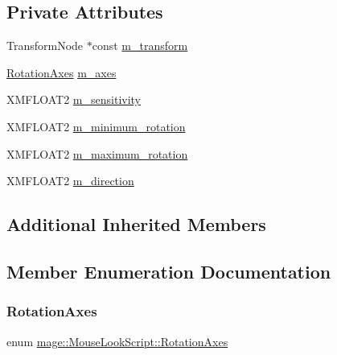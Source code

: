 \subsection*{Private Attributes}
\begin{DoxyCompactItemize}
\item 
Transform\+Node $\ast$const \hyperlink{classmage_1_1_mouse_look_script_a419b30350dc3eed30ae2f983812391f5}{m\+\_\+transform}
\item 
\hyperlink{classmage_1_1_mouse_look_script_af63fd955f796c11e0378813e5d1ab5f8}{Rotation\+Axes} \hyperlink{classmage_1_1_mouse_look_script_ab5df1b96d5860a9b8f30256e7c89b26b}{m\+\_\+axes}
\item 
X\+M\+F\+L\+O\+A\+T2 \hyperlink{classmage_1_1_mouse_look_script_a4f38b9bd8e7271503a70753ce6a923c7}{m\+\_\+sensitivity}
\item 
X\+M\+F\+L\+O\+A\+T2 \hyperlink{classmage_1_1_mouse_look_script_ad09bda241666f60dfc408500cafd073d}{m\+\_\+minimum\+\_\+rotation}
\item 
X\+M\+F\+L\+O\+A\+T2 \hyperlink{classmage_1_1_mouse_look_script_a0d5f2933555b76efd7cf83c7672574dd}{m\+\_\+maximum\+\_\+rotation}
\item 
X\+M\+F\+L\+O\+A\+T2 \hyperlink{classmage_1_1_mouse_look_script_a07c9a61869dab687a0426fa0c4b41fa7}{m\+\_\+direction}
\end{DoxyCompactItemize}
\subsection*{Additional Inherited Members}


\subsection{Member Enumeration Documentation}
\hypertarget{classmage_1_1_mouse_look_script_af63fd955f796c11e0378813e5d1ab5f8}{}\label{classmage_1_1_mouse_look_script_af63fd955f796c11e0378813e5d1ab5f8} 
\subsubsection{\texorpdfstring{Rotation\+Axes}{RotationAxes}}
{\footnotesize\ttfamily enum \hyperlink{classmage_1_1_mouse_look_script_af63fd955f796c11e0378813e5d1ab5f8}{mage\+::\+Mouse\+Look\+Script\+::\+Rotation\+Axes}\hspace{0.3cm}{\ttfamily [strong]}}

